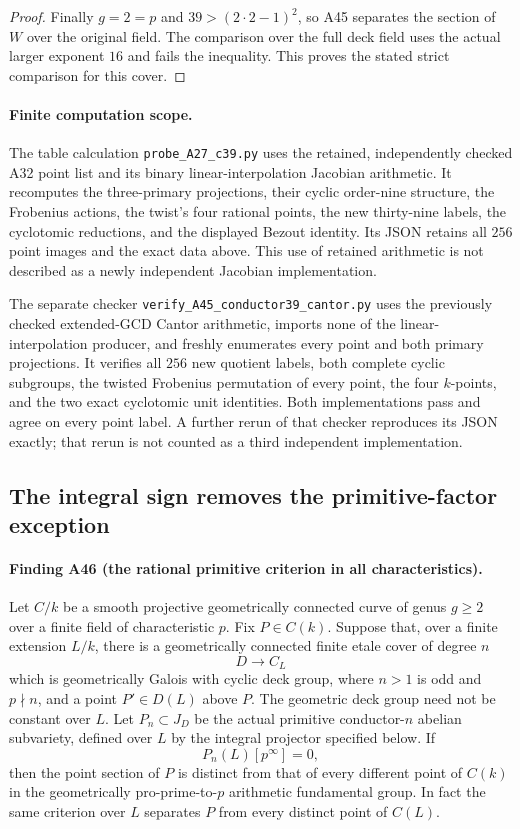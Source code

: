 \documentclass[11pt,a4paper]{article}
\begin{document}
\begin{proof}
Finally $g=2=p$ and $39>(2\cdot2-1)^2$, so A45 separates
the section of $W$ over the original field. The comparison
over the full deck field uses the actual larger exponent
$16$ and fails the inequality. This proves the stated strict
comparison for this cover.
\end{proof}

\paragraph{Finite computation scope.}
The table calculation \texttt{probe\_A27\_c39.py} uses the
retained, independently checked A32 point list and its binary
linear-interpolation Jacobian arithmetic. It recomputes the
three-primary projections, their cyclic order-nine structure,
the Frobenius actions, the twist's four rational points, the
new thirty-nine labels, the cyclotomic reductions, and the
displayed Bezout identity. Its JSON retains all $256$ point
images and the exact data above. This use of retained arithmetic
is not described as a newly independent Jacobian implementation.


The separate checker \texttt{verify\_A45\_conductor39\_cantor.py}
uses the previously checked extended-GCD Cantor arithmetic,
imports none of the linear-interpolation producer, and freshly
enumerates every point and both primary projections. It verifies
all $256$ new quotient labels, both complete cyclic subgroups,
the twisted Frobenius permutation of every point, the four
$k$-points, and the two exact cyclotomic unit identities.
Both implementations pass and agree on every point label.
A further rerun of that checker reproduces its JSON exactly;
that rerun is not counted as a third independent implementation.


\subsection{The integral sign removes the primitive-factor exception}
\label{sec:primitive-integral-sign}

\paragraph{Finding A46 (the rational primitive criterion in all characteristics).}
Let $C/k$ be a smooth projective geometrically connected curve of
genus $g\ge2$ over a finite field of characteristic $p$.
Fix $P\in C(k)$. Suppose that, over a finite extension $L/k$,
there is a geometrically connected finite etale cover of degree $n$
\[
               D\longrightarrow C_L
\]
which is geometrically Galois with cyclic deck group, where
$n>1$ is odd and $p\nmid n$, and a point $P'\in D(L)$ above $P$.
The geometric deck group need not be constant over $L$.
Let $P_n\subset J_D$ be the actual primitive conductor-$n$
abelian subvariety, defined over $L$ by the integral projector
specified below. If
\[
                         P_n(L)[p^\infty]=0,
 \tag{IS.1}
\]
then the point section of $P$ is distinct from that of every
different point of $C(k)$ in the geometrically pro-prime-to-$p$
arithmetic fundamental group. In fact the same criterion over
$L$ separates $P$ from every distinct point of $C(L)$.
\end{document}
